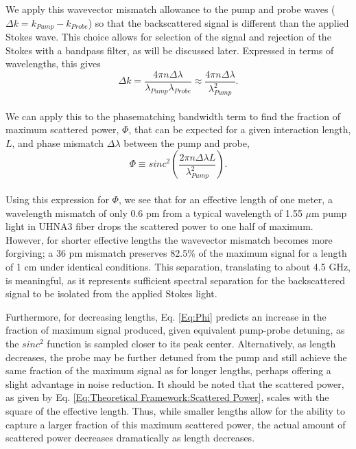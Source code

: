 \documentclass[%
  reprint,
  superscriptaddress,
  amsmath,amssymb,
  aps,
  prapplied,
]{revtex4-2}
\begin{document}
We apply this wavevector mismatch allowance to the pump and probe waves ($\Delta k = k_{Pump} - k_{Probe}$) so that the backscattered signal is different than the applied Stokes wave. This choice allows for selection of the signal and rejection of the Stokes with a bandpass filter, as will be discussed later. Expressed in terms of wavelengths, this gives
\\
\begin{equation}
  \Delta k = \frac{4\pi n\Delta\lambda}{\lambda_{Pump}\lambda_{Probe}} \approx \frac{4\pi n\Delta\lambda}{\lambda_{Pump}^{2}}.
\end{equation}
\\
We can apply this to the phasematching bandwidth term to find the fraction of maximum scattered power, $\Phi$, that can be expected for a given interaction length, $L$, and phase mismatch $\Delta\lambda$ between the pump and probe,
\\
\begin{equation}
  \Phi \equiv sinc^{2}\left(\frac{2\pi n\Delta\lambda L}{\lambda_{Pump}^{2}}\right).
  \label{Eq:Phi}
\end{equation}
\\
Using this expression for $\Phi$, we see that for an effective length of one meter, a wavelength mismatch of only 0.6 pm from a typical wavelength of 1.55 $\mu$m pump light in UHNA3 fiber drops the scattered power to one half of maximum. However, for shorter effective lengths the wavevector mismatch becomes more forgiving; a 36 pm mismatch preserves 82.5\% of the maximum signal for a length of 1 cm under identical conditions. This separation, translating to about 4.5 GHz, is meaningful, as it represents sufficient spectral separation for the backscattered signal to be isolated from the applied Stokes light.

Furthermore, for decreasing lengths, Eq. \ref{Eq:Phi} predicts an increase in the fraction of maximum signal produced, given equivalent pump-probe detuning, as the $sinc^{2}$ function is sampled closer to its peak center. Alternatively, as length decreases, the probe may be further detuned from the pump and still achieve the same fraction of the maximum signal as for longer lengths, perhaps offering a slight advantage in noise reduction. It should be noted that the scattered power, as given by Eq. \ref{Eq:Theoretical Framework:Scattered Power}, scales with the square of the effective length. Thus, while smaller lengths allow for the ability to capture a larger fraction of this maximum scattered power, the actual amount of scattered power decreases dramatically as length decreases.
\end{document}
